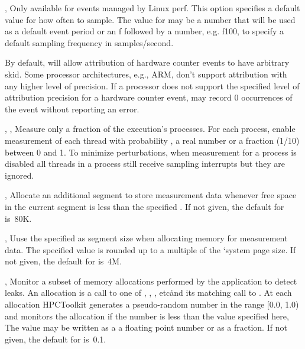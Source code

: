 \documentclass[english]{article}
\begin{document}
\begin{Description}
\item[\OptArg{-c}{howoften}, \OptArg{--count}{howoften}]
                       Only available for events managed by Linux perf. This option
                       specifies a default value for how often to sample. The value for  may be a number that will be used as a default
                       event period or an f followed by a number, e.g. f100, to specify a default sampling frequency in samples/second.

By default,  will allow attribution of hardware counter events to have arbitrary skid. 
Some processor architectures, e.g., ARM,  don't support attribution with any higher level of precision.
If a processor does not support the specified level of attribution precision for a hardware counter event, 
 may record 0 occurrences of the event without reporting an error.


\item[\OptArg{-f}{frac}, \OptArg{-fp}{frac}, \OptArg{--process-fraction}{frac}]
Measure only a fraction  of the execution's processes.
For each process, enable measurement of each thread with probability , a real number or a fraction (1/10) between 0 and 1.
To minimize perturbations, when measurement for a process is disabled
all threads in a process still receive sampling interrupts but they are ignored.

\item[\OptArg{-lm}{size}, \OptArg{--low-memsize}{size}]
Allocate an additional segment to store measurement data
whenever free space in the current segment is less than the specified .
If not given, the default for  is~80K.

\item[\OptArg{-m}{size}, \OptArg{--memsize}{size}]
Uuse the specified  as segment size when allocating memory for measurement data.
The specified value is rounded up to a multiple of the `system page size.
If not given, the default for  is~4M.

\item[\OptArg{-mp}{prob}, \OptArg{--memleak-prob}{prob}]
Monitor a subset of memory allocations performed by the application to detect leaks.
An allocation is a call to one of , , , etc\.
and its matching call to .
At each allocation HPCToolkit generates a pseudo-random number in the range [0.0, 1.0)
and monitors the allocation if the number is less than the value  specified here,
The value may be written as a a floating point number or as a fraction.
If not given, the default for  is~0.1.


\end{Description}
\end{document}
